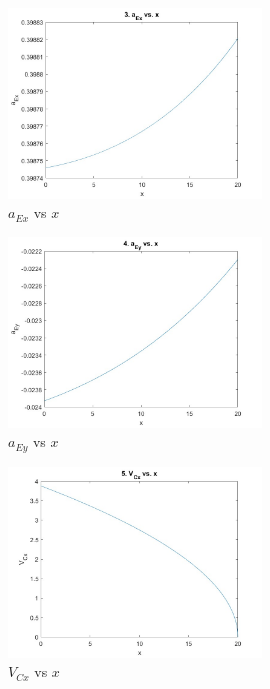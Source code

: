 \documentclass[12pt, a4paper]{article}
\begin{document}
\FloatBarrier

\begin{figure}[htbp]
    \centering
    \includegraphics[width=0.6\textwidth]{graph3.jpg}
    \caption{$a_{Ex}$ vs $x$}
    \label{fig:label2}
\end{figure}

\FloatBarrier

\begin{figure}[htbp]
    \centering
    \includegraphics[width=0.6\textwidth]{graph4.jpg}
    \caption{$a_{Ey}$ vs $x$}
    \label{fig:label2}
\end{figure}

\FloatBarrier

\begin{figure}[htbp]
    \centering
    \includegraphics[width=0.6\textwidth]{graph5.jpg}
    \caption{$V_{Cx}$ vs $x$}
    \label{fig:label2}
\end{figure}
\end{document}
